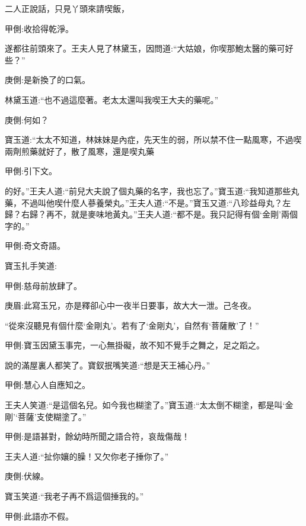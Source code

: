 \begin{parag}
    二人正說話，只見丫頭來請喫飯，\begin{note}甲側:收拾得乾淨。\end{note}遂都往前頭來了。王夫人見了林黛玉，因問道:“大姑娘，你喫那鮑太醫的藥可好些？”\begin{note}庚側:是新換了的口氣。\end{note}林黛玉道:“也不過這麼著。老太太還叫我喫王大夫的藥呢。”\begin{note}庚側:何如？\end{note}寶玉道:“太太不知道，林妹妹是內症，先天生的弱，所以禁不住一點風寒，不過喫兩劑煎藥就好了，散了風寒，還是喫丸藥\begin{note}甲側:引下文。\end{note}的好。”王夫人道:“前兒大夫說了個丸藥的名字，我也忘了。”寶玉道:“我知道那些丸藥，不過叫他喫什麼人蔘養榮丸。”王夫人道:“不是。”寶玉又道:“八珍益母丸？左歸？右歸？再不，就是麥味地黃丸。”王夫人道:“都不是。我只記得有個‘金剛’兩個字的。”\begin{note}甲側:奇文奇語。\end{note}寶玉扎手笑道:\begin{note}甲側:慈母前放肆了。\end{note}\begin{note}庚眉:此寫玉兄，亦是釋卻心中一夜半日要事，故大大一泄。己冬夜。\end{note}“從來沒聽見有個什麼‘金剛丸’。若有了‘金剛丸’，自然有‘菩薩散’了！”\begin{note}甲側:寶玉因黛玉事完，一心無掛礙，故不知不覺手之舞之，足之蹈之。\end{note}說的滿屋裏人都笑了。寶釵抿嘴笑道:“想是天王補心丹。”\begin{note}甲側:慧心人自應知之。\end{note}王夫人笑道:“是這個名兒。如今我也糊塗了。”寶玉道:“太太倒不糊塗，都是叫‘金剛’‘菩薩’支使糊塗了。”\begin{note}甲側:是語甚對，餘幼時所聞之語合符，哀哉傷哉！\end{note}王夫人道:“扯你孃的臊！又欠你老子捶你了。”\begin{note}庚側:伏線。\end{note}寶玉笑道:“我老子再不爲這個捶我的。”\begin{note}甲側:此語亦不假。\end{note}
\end{parag}


